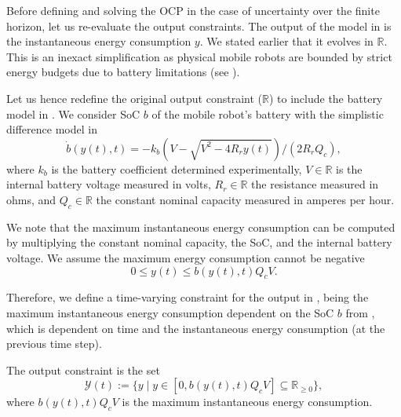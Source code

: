 Before defining and solving the OCP in the case of uncertainty over the finite horizon, let us re-evaluate the output constraints. The output of the model in  is the instantaneous energy consumption $y$. We stated earlier that it evolves in $\mathbb{R}$. This is an inexact simplification as physical mobile robots are bounded by strict energy budgets due to battery limitations (see ).

Let us hence redefine the original output constraint ($\mathbb{R}$) to include the battery model in . We consider SoC $b$ of the mobile robot's battery with the simplistic difference model in 
\begin{equation}\label{eq:bat}
  \dot{b}(y(t),t)=-k_b\left(V-
  \sqrt{
    V^2-
    4R_ry(t)}
  \right)/(2R_rQ_c),
\end{equation}
where $k_b$ is the battery coefficient determined experimentally,  $V\in\mathbb{R}$ is the internal battery voltage measured in volts, $R_r\in\mathbb{R}$ the resistance measured in ohms, and $Q_c\in\mathbb{R}$ the constant nominal capacity measured in amperes per hour. 

We note that the maximum instantaneous energy consumption can be computed by multiplying the constant nominal capacity, the SoC, and the internal battery voltage. We assume the maximum energy consumption cannot be negative
\begin{equation}
  0\leq y(t)\leq b(y(t),t)Q_cV.
\end{equation}

Therefore, we define a time-varying constraint for the output in , being the maximum instantaneous energy consumption dependent on the SoC $b$ from , which is dependent on time and the instantaneous energy consumption (at the previous time step).

\begin{highlight}
\begin{defn}\label{def:const}
The output constraint is the set
\begin{equation*}
  \mathcal{Y}(t):=\{y\mid y\in[0,b(y(t),t)Q_cV]\subseteq{\mathbb{R}_{\geq 0}}\},
\end{equation*}
where $b(y(t),t)Q_cV$ is the maximum instantaneous energy consumption.
\end{defn}
\end{highlight}

